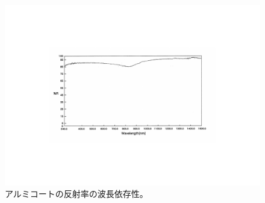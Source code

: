 \begin{figure}
  \centering
  \includegraphics[width=15cm]{images/chapter3/Al_reflection.pdf}
  \caption{アルミコートの反射率の波長依存性\cite{ref7}。}
  \label{fig:Al_reflection}
\end{figure}

